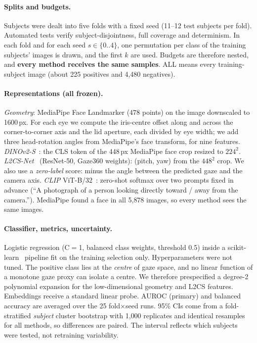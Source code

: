 \documentclass[10pt,twocolumn]{article}
\begin{document}
\paragraph{Splits and budgets.}
Subjects were dealt into five folds with a fixed seed (11--12 test subjects per fold). Automated
tests verify subject-disjointness, full coverage and determinism. In each fold and for each seed
$s\in\{0..4\}$, one permutation per class of the training subjects' images is drawn, and the first $k$
are used. Budgets are therefore nested, and \textbf{every method receives the same samples}.
ALL means every training-subject image (about 225 positives and 4{,}480 negatives).

\paragraph{Representations (all frozen).}
\emph{Geometry}: MediaPipe Face Landmarker (478 points) on the image downscaled to 1600\,px. For each eye
we compute the iris-centre offset along and across the corner-to-corner axis and the lid aperture,
each divided by eye width; we add three head-rotation angles from MediaPipe's face transform, for nine features.
\emph{DINOv2-S}~\cite{oquab2024dinov2}: the CLS token of the 448\,px MediaPipe face crop resized to $224^2$.
\emph{L2CS-Net}~\cite{abdelrahman2023l2cs} (ResNet-50, Gaze360 weights): (pitch, yaw) from the $448^2$ crop.
We also use a \emph{zero-label} score: minus the angle between the predicted gaze and the camera axis.
\emph{CLIP} ViT-B/32~\cite{radford2021clip}: zero-shot softmax over two prompts fixed in advance
(``A photograph of a person looking directly toward / away from the camera.'').
MediaPipe found a face in all 5{,}878 images, so every method sees the same images.

\paragraph{Classifier, metrics, uncertainty.}
Logistic regression (C$=$1, balanced class weights, threshold 0.5) inside a scikit-learn~\cite{pedregosa2011sklearn}
pipeline fit on the training selection only. Hyperparameters were not tuned.
The positive class lies at the \emph{centre} of gaze space, and no linear function of a monotone
gaze proxy can isolate a centre. We therefore prespecified a degree-2 polynomial expansion for the
low-dimensional geometry and L2CS features. Embeddings receive a standard linear probe.
AUROC (primary) and balanced accuracy are averaged over the 25 fold$\times$seed runs.
95\% CIs come from a fold-stratified \emph{subject} cluster bootstrap with 1{,}000 replicates and
identical resamples for all methods, so differences are paired. The interval reflects which subjects
were tested, not retraining variability.
\end{document}
